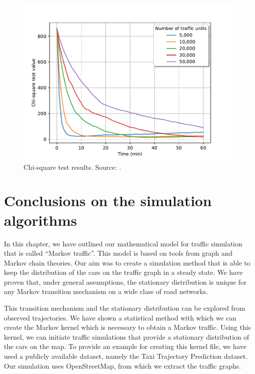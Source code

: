 \documentclass[b5paper,12pt]{report}
\theoremstyle{definition}
\begin{document}
\begin{figure}[!t]
    \centering
    \includegraphics[width=.8\textwidth]{img/DIST.pdf}
    \caption{Chi-square test results. Source: \cite{traffic-paper}.}
    \label{DIST_chi_sq}
\end{figure}

\section{Conclusions on the simulation algorithms}

In this chapter, we have outlined our mathematical model for traffic simulation that is called \enquote{Markov traffic}. This model is based on tools from graph and Markov chain theories. Our aim was to create a simulation method that is able to keep the distribution of the cars on the traffic graph in a steady state. We have proven that, under general assumptions, the stationary distribution is unique for any Markov transition mechanism on a wide class of road networks.

This transition mechanism and the stationary distribution can be explored from observed trajectories. We have shown a statistical method with which we can create the Markov kernel which is necessary to obtain a Markov traffic. Using this kernel, we can initiate traffic simulations that provide a stationary distribution of the cars on the map. To provide an example for creating this kernel file, we have used a publicly available dataset, namely the Taxi Trajectory Prediction dataset. Our simulation uses OpenStreetMap, from which we extract the traffic graphs.
\end{document}
